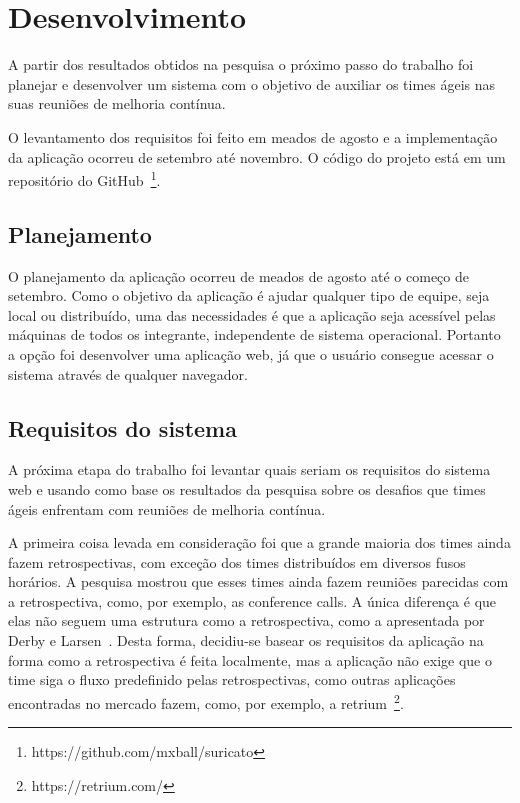 \section{Desenvolvimento}

A partir dos resultados obtidos na pesquisa o próximo passo do trabalho foi  planejar e desenvolver um sistema com o objetivo de auxiliar os times ágeis nas suas reuniões de melhoria contínua.

O levantamento dos requisitos foi feito em meados de agosto e a implementação da aplicação ocorreu de setembro até novembro. O código do projeto está em um repositório do GitHub~\footnote{https://github.com/mxball/suricato}.

\subsection{Planejamento}

O planejamento da aplicação ocorreu de meados de agosto até o começo de setembro. Como o objetivo da aplicação é ajudar qualquer tipo de equipe, seja local ou distribuído, uma das necessidades é que a aplicação seja acessível pelas máquinas de todos os integrante, independente de sistema operacional. Portanto a opção foi desenvolver uma aplicação web, já que o usuário consegue acessar o sistema através de qualquer navegador.

\subsection{Requisitos do sistema}

A próxima etapa do trabalho foi levantar quais seriam os requisitos do sistema web e usando como base os resultados da pesquisa sobre os desafios que times ágeis enfrentam com reuniões de melhoria contínua.

A primeira coisa levada em consideração foi que a grande maioria dos times ainda fazem retrospectivas, com exceção dos times distribuídos em diversos fusos horários. A pesquisa mostrou que esses times ainda fazem reuniões parecidas com a retrospectiva, como, por exemplo, as conference calls. A única diferença é que elas não seguem uma estrutura como a retrospectiva, como a apresentada por Derby e Larsen~\cite{retrospectives}. Desta forma, decidiu-se basear os requisitos da aplicação na forma como a retrospectiva é feita localmente, mas a aplicação não exige que o time siga o fluxo predefinido pelas retrospectivas, como outras aplicações encontradas no mercado fazem, como, por exemplo, a retrium~\footnote{https://retrium.com/}.

